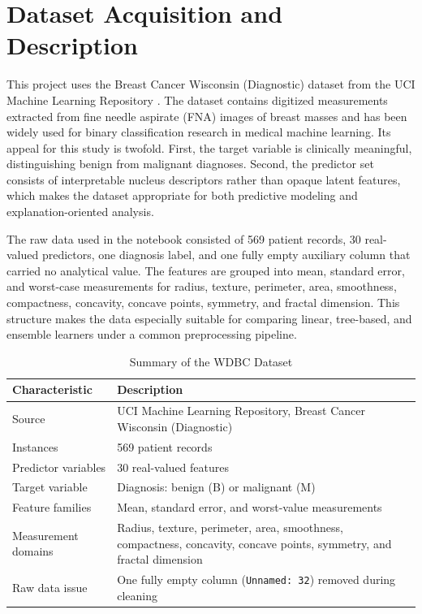 \documentclass[conference]{IEEEtran}
\begin{document}
\section{Dataset Acquisition and Description}
This project uses the Breast Cancer Wisconsin (Diagnostic) dataset from the UCI Machine Learning Repository \cite{b12}. The dataset contains digitized measurements extracted from fine needle aspirate (FNA) images of breast masses and has been widely used for binary classification research in medical machine learning. Its appeal for this study is twofold. First, the target variable is clinically meaningful, distinguishing benign from malignant diagnoses. Second, the predictor set consists of interpretable nucleus descriptors rather than opaque latent features, which makes the dataset appropriate for both predictive modeling and explanation-oriented analysis.

The raw data used in the notebook consisted of 569 patient records, 30 real-valued predictors, one diagnosis label, and one fully empty auxiliary column that carried no analytical value. The features are grouped into mean, standard error, and worst-case measurements for radius, texture, perimeter, area, smoothness, compactness, concavity, concave points, symmetry, and fractal dimension. This structure makes the data especially suitable for comparing linear, tree-based, and ensemble learners under a common preprocessing pipeline.

\begin{table}[htbp]
\caption{Summary of the WDBC Dataset}
\label{tab:wdbc_summary}
\centering
\footnotesize
\begin{tabularx}{\columnwidth}{>{\raggedright\arraybackslash}p{}X}
\toprule
\textbf{Characteristic} & \textbf{Description} \\
\midrule
Source & UCI Machine Learning Repository, Breast Cancer Wisconsin (Diagnostic) \cite{b12} \\
Instances & 569 patient records \\
Predictor variables & 30 real-valued features \\
Target variable & Diagnosis: benign (B) or malignant (M) \\
Feature families & Mean, standard error, and worst-value measurements \\
Measurement domains & Radius, texture, perimeter, area, smoothness, compactness, concavity, concave points, symmetry, and fractal dimension \\
Raw data issue & One fully empty column (\texttt{Unnamed: 32}) removed during cleaning \\
\bottomrule
\end{tabularx}
\end{table}
\end{document}
